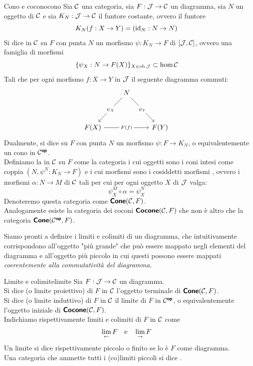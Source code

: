 \documentclass[openany]{book}
\renewcommand\C{\mc{C}}
\newcommand\J{\mc{J}}
\begin{document}
\begin{definition}{Cono e cocono}{cono}
    Sia $\C$ una categoria, sia $F: \J\to\C$ un diagramma, sia $N$ un oggetto di $\C$ e sia $K_N:\J\to\C$ il funtore costante, ovvero il funtore 
    \[K_N(f:X\to Y) = (\operatorname{id}_N:N\to N)\]
    Si dice  in $\C$ su $F$ con punta $N$ un morfismo $\psi : K_N \to F$ di $[\J,\C]$, ovvero una famiglia di morfismi \[\{\psi_X : N\to F(X)\}_{X \in \ob\J} \subset \hom\C\]
    Tali che per ogni morfismo $f:X\to Y$ in $\J$ il seguente diagramma commuti:
    \[\begin{tikzcd}
    	& N \\
    	\\
    	{F(X)} && {F(Y)}
    	\arrow["{\psi_X}"{description}, from=1-2, to=3-1]
    	\arrow["{\psi_Y}"{description}, from=1-2, to=3-3]
	    \arrow["{F(f)}"{description}, from=3-1, to=3-3]
    \end{tikzcd}\]
    Dualmente, si dice  su $F$ con punta $N$ un morfismo $\psi : F \to K_N$, o equivalentemente un cono in $\C^\op$.\\
    Definiamo la  in $\C$ su $F$ come la categoria i cui oggetti sono i coni intesi come coppia $(N, \psi^N: K_N \to F )$ e i cui morfismi sono i cosiddetti morfismi , ovvero i morfismi $\alpha : N\to M$ di $\C$ tali per cui per ogni oggetto $X$ di $\J$ valga:
    \[\psi^M_X\circ \alpha = \psi^N_X\]
    Denoteremo questa categoria come $\cone(\C,F)$.\\
    Analogamente esiste la categoria dei coconi $\catname{Cocone}(\C,F)$ che non è altro che la categoria $\cone(\C^\op, F)$.
\end{definition}

Siamo pronti a definire i limiti e colimiti di un diagramma, che intuitivamente corrispondono all'oggetto "più grande" che può essere mappato negli elementi del diagramma e all'oggetto più piccolo in cui questi possono essere mappati \textit{coerentemente alla commutatività del diagramma}.

\begin{definition}{Limite e colimite}{limite}
    Sia $F:\J\to\C$ un diagramma.\\
    Si dice  (o limite proiettivo) di $F$ in $\C$ l'oggetto terminale di $\cone(\C,F)$.\\
    Si dice  (o limite induttivo) di $F$ in $\C$ il limite di $F$ in $\C^\op$, o equivalentemente l'oggetto iniziale di $\catname{Cocone}(\C,F)$.\\
    Indichiamo rispettivamente limiti e colimiti di $F$ in $\C$ come
    \[ \lim_{\leftarrow} F \quad \text{e}\quad\lim_{\rightarrow} F\]
    Un limite si dice rispettivamente piccolo o finito se lo è $F$ come diagramma.\\
    Una categoria che ammette tutti i (co)limiti piccoli si dice .
\end{definition}
\end{document}
